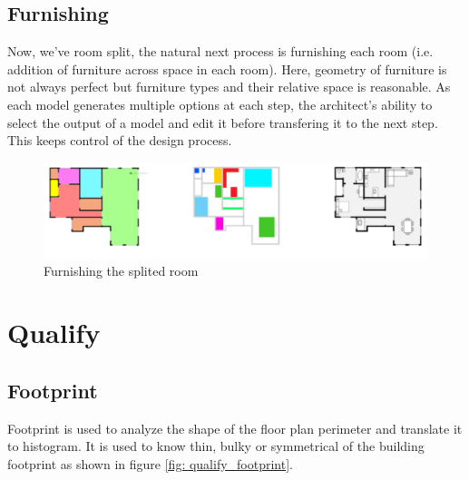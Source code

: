                 \subsection{Furnishing}
                        Now, we've room split, the natural next process is furnishing each room (i.e. addition of furniture across space in each room). Here, geometry of furniture is not always perfect but furniture types and their relative space is reasonable. 
                        As each model generates multiple options at each step, the architect's ability to select the output of a model and edit it before transfering it to the next step. This keeps control of the design process.
                        \begin{figure}[h]
                                \centering
                                \includegraphics[width=1\textwidth]{img/chapter_6/furnishing.png}
                                \caption{Furnishing the splited room}
                                \label{fig: Furnishing the splited room}
                        \end{figure}
                \pagebreak
        \section{Qualify}
                \subsection{Footprint}
                        Footprint is used to analyze the shape of the floor plan perimeter and translate it to histogram. It is used to know thin, bulky or symmetrical of the building footprint as shown in figure \ref{fig: qualify_footprint}.

